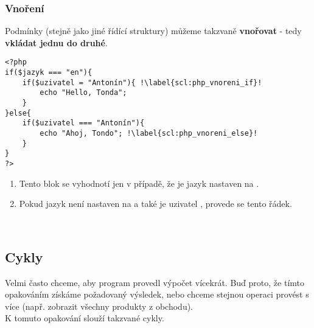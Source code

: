 \subsubsection{Vnoření}
Podmínky (stejně jako jiné řídící struktury) můžeme takzvaně \textbf{vnořovat} - tedy \textbf{vkládat jednu do druhé}.\\
\begin{minipage}[t]{.45\textwidth}
\begin{code}
\begin{verbatim}
<?php
if($jazyk === "en"){
	if($uzivatel = "Antonín"){ !\label{scl:php_vnoreni_if}!
		echo "Hello, Tonda";	
	}
}else{
	if($uzivatel === "Antonín"){
		echo "Ahoj, Tondo"; !\label{scl:php_vnoreni_else}!
	}
}
?>
\end{verbatim}

\label{code:php_vnoření}
\end{code}
\end{minipage}
\begin{minipage}[t]{.45\textwidth}
\begin{enumerate}
\item[ř. \ref{scl:php_vnoreni_if}:] Tento blok se vyhodnotí jen v případě, že je jazyk nastaven na . 
\item[ř. \ref{scl:php_vnoreni_else}:] Pokud jazyk není nastaven na  a také je uzivatel , provede se tento řádek.
\end{enumerate}
\end{minipage}\\

\subsection{Cykly}
Velmi často chceme, aby program provedl výpočet vícekrát. Buď proto, že tímto opakováním získáme požadovaný výsledek, nebo chceme stejnou operaci provést s více  (např. zobrazit všechny produkty z obchodu).\\
K tomuto opakování slouží takzvané cykly.

